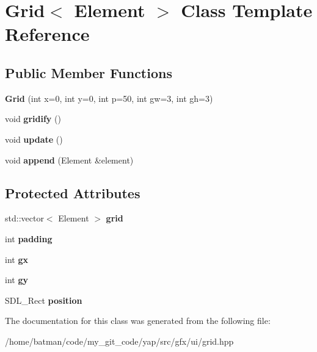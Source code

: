 \hypertarget{classGrid}{}\section{Grid$<$ Element $>$ Class Template Reference}
\label{classGrid}
\subsection*{Public Member Functions}
\begin{DoxyCompactItemize}
\item 
\hypertarget{classGrid_a9d6473a70d115ce68b14449e89b80435}{}{\bfseries Grid} (int x=0, int y=0, int p=50, int gw=3, int gh=3)\label{classGrid_a9d6473a70d115ce68b14449e89b80435}

\item 
\hypertarget{classGrid_ace1892d9c1c042ec34d3339d1736b5ff}{}void {\bfseries gridify} ()\label{classGrid_ace1892d9c1c042ec34d3339d1736b5ff}

\item 
\hypertarget{classGrid_a72b63b1c76b2132de2d333205a492356}{}void {\bfseries update} ()\label{classGrid_a72b63b1c76b2132de2d333205a492356}

\item 
\hypertarget{classGrid_a61404b16f274eae8be51b3471774f68e}{}void {\bfseries append} (Element \&element)\label{classGrid_a61404b16f274eae8be51b3471774f68e}

\end{DoxyCompactItemize}
\subsection*{Protected Attributes}
\begin{DoxyCompactItemize}
\item 
\hypertarget{classGrid_a0185fd7d0762d902e272d9ce10641a20}{}std\+::vector$<$ Element $>$ {\bfseries grid}\label{classGrid_a0185fd7d0762d902e272d9ce10641a20}

\item 
\hypertarget{classGrid_a823547c352ccd94d75b16adfb8bbb564}{}int {\bfseries padding}\label{classGrid_a823547c352ccd94d75b16adfb8bbb564}

\item 
\hypertarget{classGrid_a08f873f5d1b6e540beb79d63cca07b6a}{}int {\bfseries gx}\label{classGrid_a08f873f5d1b6e540beb79d63cca07b6a}

\item 
\hypertarget{classGrid_a702d5995bed02313afca00ff6e7dc390}{}int {\bfseries gy}\label{classGrid_a702d5995bed02313afca00ff6e7dc390}

\item 
\hypertarget{classGrid_a56594934f91fa3426b0ea22451ede533}{}S\+D\+L\+\_\+\+Rect {\bfseries position}\label{classGrid_a56594934f91fa3426b0ea22451ede533}

\end{DoxyCompactItemize}


The documentation for this class was generated from the following file\+:\begin{DoxyCompactItemize}
\item 
/home/batman/code/my\+\_\+git\+\_\+code/yap/src/gfx/ui/grid.\+hpp\end{DoxyCompactItemize}
